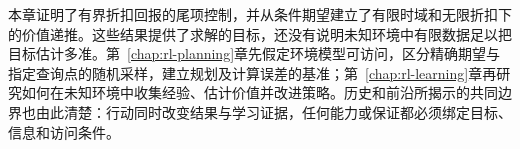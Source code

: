 本章证明了有界折扣回报的尾项控制，并从条件期望建立了有限时域和无限折扣下的价值递推。这些结果提供了求解的目标，还没有说明未知环境中有限数据足以把目标估计多准。第~\ref{chap:rl-planning}章先假定环境模型可访问，区分精确期望与指定查询点的随机采样，建立规划及计算误差的基准；第~\ref{chap:rl-learning}章再研究如何在未知环境中收集经验、估计价值并改进策略。历史和前沿所揭示的共同边界也由此清楚：行动同时改变结果与学习证据，任何能力或保证都必须绑定目标、信息和访问条件。
